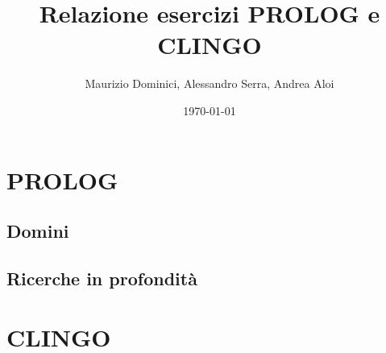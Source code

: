 \documentclass[a4paper,12pt, twoside]{report}
\title{Relazione esercizi PROLOG e CLINGO}
\author{Maurizio Dominici, Alessandro Serra, Andrea Aloi}
\date{\today}
\begin{document}
\maketitle
 
\tableofcontents

\part{PROLOG}
\chapter{Domini}

\chapter{Ricerche in profondità}


\part{CLINGO}

\end{document}
